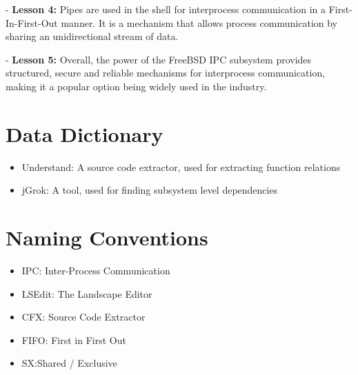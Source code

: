 \documentclass[12pt, dvipsnames, a4paper]{article}
\begin{document}
- \textbf{Lesson 4:} Pipes are used in the shell for interprocess communication in a First-In-First-Out manner. It is a mechanism that allows process communication by sharing an unidirectional stream of data.

- \textbf{Lesson 5:} Overall, the power of the FreeBSD IPC subsystem provides structured, secure and reliable mechanisms for interprocess communication, making it a popular option being widely used in the industry.
\clearpage

\section{Data Dictionary}
\begin{itemize}
	\item{Understand: A source code extractor, used for extracting function relations}
	\item {jGrok: A tool, used for finding subsystem level dependencies}
\end{itemize}

\section{Naming Conventions}
\begin{itemize}
	\item {IPC: Inter-Process Communication}
	      \item{LSEdit: The Landscape Editor}
	\item {CFX: Source Code Extractor}
	\item {FIFO: First in First Out}
	\item{SX:Shared / Exclusive}
\end{itemize}
\end{document}
